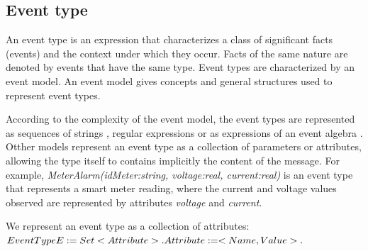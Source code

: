  \subsection{Event type}
 An event type is an expression that characterizes a class of significant facts (events) and the context under which they occur. Facts of the same nature are denoted by events that have the same type. Event types are characterized by an event model. An event model gives concepts and general structures used to represent event types.

According to the complexity of the event model, the event types are represented as sequences of strings \cite{Yuhara1994}, regular expressions \cite{Bailey1994} or as expressions of an event algebra \cite{Chakravarthy1994, Gatziu1994, Collet96}. Otther models represent an event type as a collection of parameters or attributes, allowing the type itself to contains implicitly the content of the message. For example, \textit{MeterAlarm(idMeter:string, voltage:real, current:real)} is an event type that represents a smart meter reading, where the current and voltage values observed are represented by attributes \textit{voltage} and \textit{current}.

We represent an event type as a collection of attributes:\\
$EventType E:= Set <Attribute>. \\
Attribute:= <Name, Value>.
$

